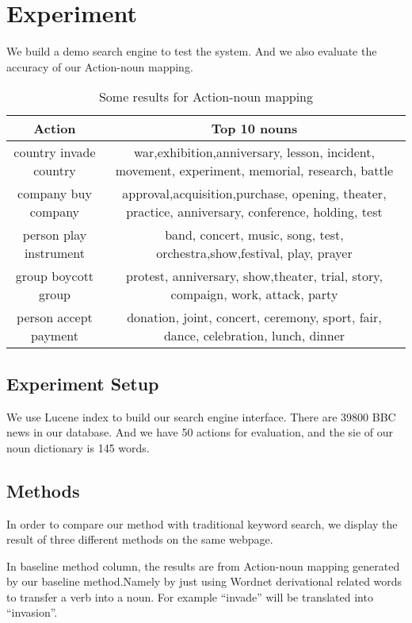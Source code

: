 \section{Experiment}
We build a demo search engine to test the system. And we also evaluate the accuracy of 
our Action-noun mapping.
\begin{table*}[th]
    \centering
    \caption{ Some results for Action-noun mapping }
    \begin{tabular} {c|c}
        \hline
        Action & Top 10 nouns\\
        \hline
        country invade country & \parbox[t]{12cm}{ war,exhibition,anniversary, lesson, incident, movement, experiment, memorial, research, battle}\\
        \hline
        company buy company & \parbox[t]{12cm} { approval,acquisition,purchase, opening, theater, practice, anniversary, conference, holding, test}\\
        \hline
        person play instrument & \parbox[t]{12cm} {band, concert, music, song, test, orchestra,show,festival, play, prayer}\\
        \hline
        group boycott group & \parbox[t]{12cm} {protest, anniversary, show,theater, trial, story, compaign, work, attack, party}\\
        \hline
        person accept payment & \parbox[t]{12cm} {donation, joint, concert, ceremony, sport, fair, dance, celebration, lunch, dinner}\\
        \hline
    \end{tabular}
\end{table*}
\subsection{Experiment Setup}
We use Lucene index to build our search engine interface. There are 39800 BBC news in our
database. And we have 50 actions for evaluation, and the sie of our noun dictionary is
145 words.
\subsection{Methods}
In order to compare our method with traditional keyword search,
we display the result of three different methods on the same webpage.


In baseline method column, the results are from Action-noun mapping 
generated by our baseline method.Namely by just using Wordnet derivational
 related words to transfer a verb into a noun.
For example ``invade'' will be translated into ``invasion''. 

